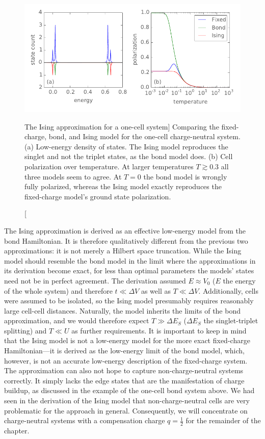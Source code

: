 %
\begin{figure}
  \center
  \includegraphics{ising_approximation1}
  \caption
  [The Ising approximation for a one-cell system]
  {
  Comparing the fixed-charge, bond, and Ising model for the one-cell
  charge-neutral  system. (a) Low-energy density of states. The Ising model
  reproduces the singlet and not the triplet states, as the bond model does. (b)
  Cell polarization over temperature. At larger temperatures $T \gtrsim 0.3$ all
  three models seem to agree. At $T = 0$ the bond model is wrongly fully
  polarized, whereas the Ising model exactly reproduces the fixed-charge model's
  ground state polarization.
  }
  \label{fig:ising_approximation1}
\end{figure}
%
The Ising approximation is derived as an effective low-energy model from the
bond Hamiltonian. It is therefore qualitatively different from the previous two
approximations: it is not merely a Hilbert space truncation. While the Ising
model should resemble the bond model in the limit where the approximations in
its derivation become exact, for less than optimal parameters the models' states
need not be in perfect agreement. The derivation assumed $E \approx V_0$ ($E$
the energy of the whole system) and therefore $t \ll \Delta V$ as well as $T \ll
\Delta V$. Additionally, cells were assumed to be isolated, so the Ising model
presumably requires reasonably large cell-cell distances. Naturally, the model
inherits the limits of the bond approximation, and we would therefore expect $T
\gg \Delta E_S$ ($\Delta E_S$ the singlet-triplet splitting) and $T \ll U$ as
further requirements. It is important to keep in mind that the Ising model is
not a low-energy model for the more exact fixed-charge Hamiltonian---it is
derived as the low-energy limit of the bond model, which, however, is not an
accurate low-energy description of the fixed-charge system. The approximation
can also not hope to capture non-charge-neutral systems correctly. It simply
lacks the edge states that are the manifestation of charge buildup, as discussed
in the example of the one-cell bond system above. We had seen in the derivation
of the Ising model that non-charge-neutral cells are very problematic for the
 approach in general. Consequently, we will concentrate on
charge-neutral systems with a compensation charge $q = \frac{1}{2}$ for the
remainder of the chapter.

